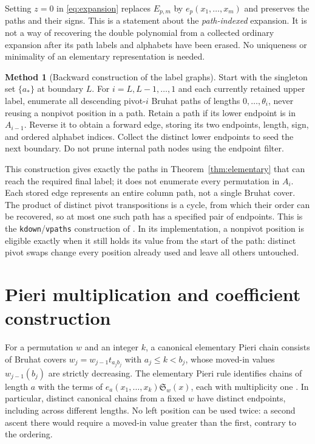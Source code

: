 \documentclass{amsart}
\theoremstyle{definition}
\newtheorem{method}[theorem]{Method}
\theoremstyle{remark}
\numberwithin{equation}{section}
\newcommand{\Sch}{\mathfrak S}
\begin{document}
Setting $z=0$ in \eqref{eq:expansion} replaces $E_{p,m}$ by
$e_p(x_1,\ldots,x_m)$ and preserves the paths and their signs.
This is a statement about the \emph{path-indexed} expansion.
It is not a way of recovering the double polynomial from a collected
ordinary expansion after its path labels and alphabets have been erased.
No uniqueness or minimality of an elementary representation is needed.

\begin{method}[Backward construction of the label graphs]\label{method:labels}
Start with the singleton set $\{a_*\}$ at boundary $L$.
For $i=L,L-1,\ldots,1$ and each currently retained upper label,
enumerate all descending pivot-$i$ Bruhat paths of lengths
$0,\ldots,\theta_i$, never reusing a nonpivot position in a path.
Retain a path if its lower endpoint is in $A_{i-1}$.
Reverse it to obtain a forward edge, storing its two endpoints,
length, sign, and ordered alphabet indices.
Collect the distinct lower endpoints to seed the next boundary.
Do not prune internal path nodes using the endpoint filter.
\end{method}

This construction gives exactly the paths in Theorem~\ref{thm:elementary}
that can reach the required final label; it does not enumerate every
permutation in $A_i$.
Each stored edge represents an entire column path, not a single Bruhat cover.
The product of distinct pivot transpositions is a cycle, from which
their order can be recovered, so at most one such path has a specified
pair of endpoints.
This is the \texttt{kdown}/\texttt{vpaths} construction of
\cite[Methods~4.9--4.10]{samuelquantum}.
In its implementation, a nonpivot position is eligible exactly when it
still holds its value from the start of the path: distinct pivot swaps
change every position already used and leave all others untouched.

\section{Pieri multiplication and coefficient construction}\label{sec:pieri}

For a permutation $w$ and an integer $k$, a canonical elementary
Pieri chain consists of Bruhat covers
$w_j=w_{j-1}t_{a_j b_j}$ with $a_j\leq k<b_j$,
whose moved-in values $w_{j-1}(b_j)$ are strictly decreasing.
The elementary Pieri rule identifies chains of length $a$ with the
terms of $e_a(x_1,\ldots,x_k)\Sch_w(x)$, each with multiplicity one
\cite{sottile}.
In particular, distinct canonical chains from a fixed $w$ have distinct
endpoints, including across different lengths.
No left position can be used twice: a second ascent there would require
a moved-in value greater than the first, contrary to the ordering.
\end{document}
